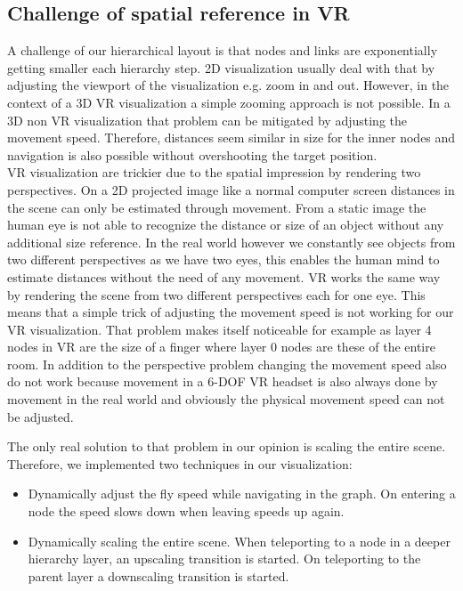 \subsection{Challenge of spatial reference in VR}
\label{chap:ps-spatialReference}
A challenge of our hierarchical layout is that nodes and links are exponentially getting smaller each hierarchy step. 
2D visualization usually deal with that by adjusting the viewport of the visualization e.g. zoom in and out. 
However, in the context of a 3D VR visualization a simple zooming approach is not possible. 
In a 3D non VR visualization that problem can be mitigated by adjusting the movement speed. Therefore, distances seem similar in size for the inner nodes and navigation is also possible without overshooting the target position.\\ 
VR visualization are trickier due to the spatial impression by rendering two perspectives. On a 2D projected image like a normal computer screen distances in the scene can only be estimated through movement. From a static image the human eye is not able to recognize the distance or size of an object without any additional size reference. 
In the real world however we constantly see objects from two different perspectives as we have two eyes, this enables the human mind to estimate distances without the need of any movement. VR works the same way by rendering the scene from two different perspectives each for one eye.  
This means that a simple trick of adjusting the movement speed is not working for our VR visualization. 
That problem makes itself noticeable for example as layer 4 nodes in VR are the size of a finger where layer 0 nodes are these of the entire room.
In addition to the perspective problem changing the movement speed also do not work because movement in a 6-DOF VR headset is also always done by movement in the real world and obviously the physical movement speed can not be adjusted.

The only real solution to that problem in our opinion is scaling the entire scene. Therefore, we implemented two techniques in our visualization:
\begin{itemize}
    \item Dynamically adjust the fly speed while navigating in the graph. On entering a node the speed slows down when leaving speeds up again. 
    \item Dynamically scaling the entire scene. When teleporting to a node in a deeper hierarchy layer, an upscaling transition is started. On teleporting to the parent layer a downscaling transition is started. 
\end{itemize} 

